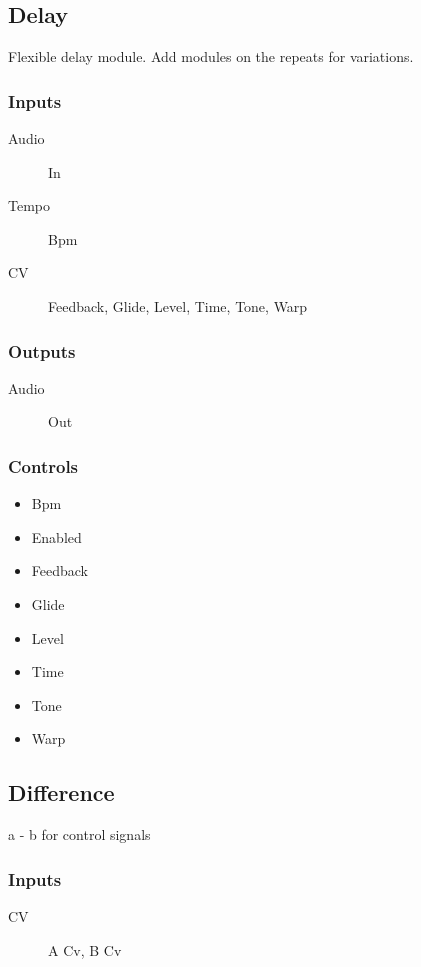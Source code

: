 \subsection{Delay}

Flexible delay module. Add modules on the repeats for variations.



\subsubsection{Inputs}
\begin{description}
\item [Audio] In
\item [Tempo] Bpm
\item [CV] Feedback, Glide, Level, Time, Tone, Warp
\end{description}

\subsubsection{Outputs}
\begin{description}
\item [Audio] Out
\end{description}

\subsubsection{Controls}
\begin{itemize}
\item Bpm
\item Enabled
\item Feedback
\item Glide
\item Level
\item Time
\item Tone
\item Warp
\end{itemize}

\subsection{Difference}

a - b for control signals



\subsubsection{Inputs}
\begin{description}
\item [CV] A Cv, B Cv
\end{description}

